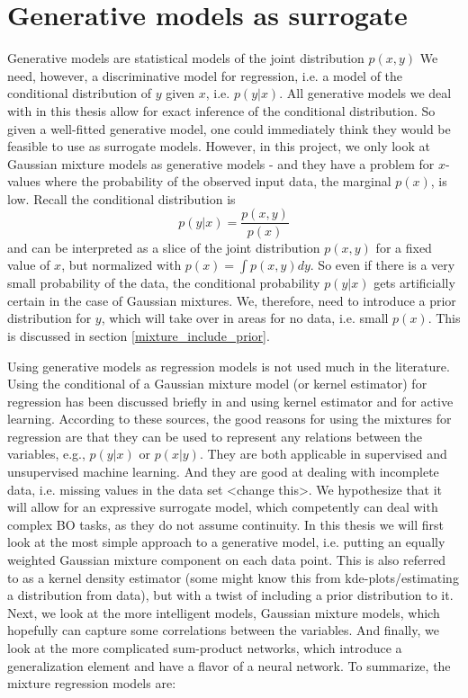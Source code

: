 \chapter{Generative models as surrogate}
Generative models are statistical models of the joint distribution $p(x,y)$ We need, however, a
discriminative model for regression, i.e. a model of the conditional distribution of $y$ given $x$,
i.e. $p(y|x)$. All generative models we deal with in this thesis allow for exact inference of the
conditional distribution. So given a well-fitted generative model, one could immediately think they
would be feasible to use as surrogate models. However, in this project, we only look at Gaussian
mixture models as generative models - and they have a problem for $x$-values where the probability
of the observed input data, the marginal $p(x)$, is low. Recall the conditional distribution is 
$$p(y|x) = \frac{p(x,y)}{p(x)}$$ and can be interpreted as a slice of the joint distribution
$p(x,y)$ for a fixed value of $x$, but normalized with $p(x) = \int p(x,y) dy$. So even if there is
a very small probability of the data, the conditional probability $p(y|x)$ gets artificially certain
in the case of Gaussian mixtures. We, therefore, need to introduce a prior distribution for $y$,
which will take over in areas for no data, i.e. small $p(x)$. This is discussed in section \ref{mixture_include_prior}.

Using generative models as regression models is not used much in the literature. Using the
conditional of a Gaussian mixture model (or kernel estimator) for regression has been discussed
briefly in \cite{bishop1995neural} and using kernel estimator \cite{ALStatisticalModels} and
\cite{JordanPaper} for active learning. According to these sources, the good reasons for using the
mixtures for regression are that they can be used to represent any relations between the variables,
e.g., $p(y|x)$ or $p(x|y)$. They are both applicable in supervised and unsupervised machine learning.
And they are good at dealing with incomplete data, i.e. missing values in the data set <change
this>. We hypothesize that it will allow for an expressive surrogate model, which competently
can deal with complex BO tasks, as they do not assume continuity. In this thesis we will first look
at the most simple approach to a generative model, i.e. putting an equally weighted Gaussian mixture
component on each data point. This is also referred to as a kernel density estimator (some might know this 
from kde-plots/estimating a distribution from data), but with a twist of including a prior
distribution to it. Next, we look at the more intelligent models, Gaussian mixture models, which
hopefully can capture some correlations between the variables. And finally, we look at the more
complicated sum-product networks, which introduce a generalization element and have a flavor of a
neural network. To summarize, the mixture regression models are:

